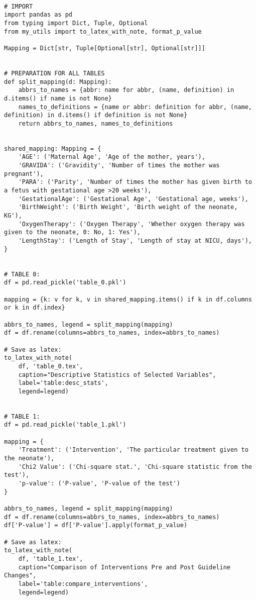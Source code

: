 \documentclass[11pt]{article}
\begin{document}
\begin{verbatim}

# IMPORT
import pandas as pd
from typing import Dict, Tuple, Optional
from my_utils import to_latex_with_note, format_p_value

Mapping = Dict[str, Tuple[Optional[str], Optional[str]]]


# PREPARATION FOR ALL TABLES
def split_mapping(d: Mapping):
    abbrs_to_names = {abbr: name for abbr, (name, definition) in d.items() if name is not None}
    names_to_definitions = {name or abbr: definition for abbr, (name, definition) in d.items() if definition is not None}
    return abbrs_to_names, names_to_definitions


shared_mapping: Mapping = {
    'AGE': ('Maternal Age', 'Age of the mother, years'),
    'GRAVIDA': ('Gravidity', 'Number of times the mother was pregnant'),
    'PARA': ('Parity', 'Number of times the mother has given birth to a fetus with gestational age >20 weeks'),
    'GestationalAge': ('Gestational Age', 'Gestational age, weeks'),
    'BirthWeight': ('Birth Weight', 'Birth weight of the neonate, KG'),
    'OxygenTherapy': ('Oxygen Therapy', 'Whether oxygen therapy was given to the neonate, 0: No, 1: Yes'),
    'LengthStay': ('Length of Stay', 'Length of stay at NICU, days'),
}


# TABLE 0:
df = pd.read_pickle('table_0.pkl')

mapping = {k: v for k, v in shared_mapping.items() if k in df.columns or k in df.index}

abbrs_to_names, legend = split_mapping(mapping)
df = df.rename(columns=abbrs_to_names, index=abbrs_to_names)

# Save as latex:
to_latex_with_note(
    df, 'table_0.tex',
    caption="Descriptive Statistics of Selected Variables",
    label='table:desc_stats',
    legend=legend)


# TABLE 1:
df = pd.read_pickle('table_1.pkl')

mapping = {
    'Treatment': ('Intervention', 'The particular treatment given to the neonate'),
    'Chi2 Value': ('Chi-square stat.', 'Chi-square statistic from the test'),
    'p-value': ('P-value', 'P-value of the test')
}

abbrs_to_names, legend = split_mapping(mapping)
df = df.rename(columns=abbrs_to_names, index=abbrs_to_names)
df['P-value'] = df['P-value'].apply(format_p_value)

# Save as latex:
to_latex_with_note(
    df, 'table_1.tex',
    caption="Comparison of Interventions Pre and Post Guideline Changes",
    label='table:compare_interventions',
    legend=legend)



\end{verbatim}
\end{document}
